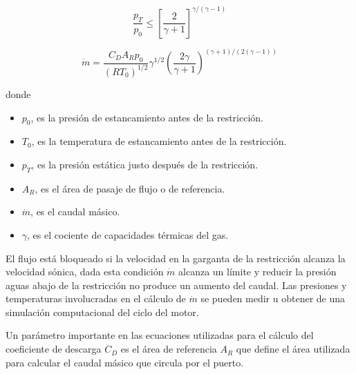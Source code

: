 \begin{equation}\label{eq:cond_bloqueo}
  \frac{p_T}{p_0} \le {[\frac{2}{\gamma+1}]}^{\gamma/(\gamma - 1)}
\end{equation}

\begin{equation}\label{eq:m_bloqueado}
  \dot{m}=  \frac {C_D A_R p_0} {{(R T_0)}^{1/2}} \gamma^{1/2} {\left( \frac{2\gamma}{\gamma+1} \right)}^{(\gamma+1)/(2(\gamma-1))}
\end{equation}

donde
\begin{itemize}
    \item $p_0$, es la presión de estancamiento antes de la restricción.
    \item $T_0$, es la temperatura de estancamiento antes de la restricción.
    \item $p_T$, es la presión estática justo después de la restricción.
    \item $A_R$, es el área de pasaje de flujo o de referencia.
    \item $\dot{m}$, es el caudal másico.
  \item $\gamma$, es el cociente de capacidades térmicas del gas.
\end{itemize}


El flujo está bloqueado si la velocidad en la garganta de la restricción alcanza
la velocidad sónica, dada esta condición $\dot{m}$ alcanza un límite y reducir
la presión aguas abajo de la restricción no produce un aumento del caudal.
%
%
Las presiones y temperaturas involucradas en el cálculo de $\dot{m}$ se pueden
medir u obtener de una simulación computacional del ciclo del motor.
%

Un parámetro importante en las ecuaciones utilizadas para el cálculo del
coeficiente de descarga $C_{D}$ es el área de referencia $A_{R}$ que define el
área utilizada para calcular el caudal másico que circula por el puerto.
%

